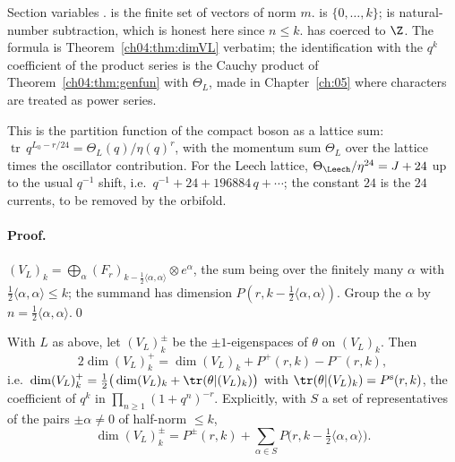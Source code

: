\begin{dictionary}
Section variables .  is the
finite set of vectors of norm $m$.  is $\{0,\dots,k\}$;  is
natural-number subtraction, which is honest here since $n\le k$.  has
 coerced to $\Z$. The formula is Theorem~\ref{ch04:thm:dimVL} verbatim; the identification
with the $q^k$ coefficient of the product series is the Cauchy product of
Theorem~\ref{ch04:thm:genfun} with $\Theta_L$, made in Chapter~\ref{ch:05} where characters are
treated as power series.
\end{dictionary}

\begin{physics}
This is the partition function of the compact boson as a lattice sum: $\operatorname{tr}\,q^{L_0-r/24}=\Theta_L(q)/\eta(q)^r$, with the momentum sum $\Theta_L$ over the lattice times the oscillator contribution. For the Leech lattice, $\Theta_\Leech/\eta^{24}=J+24$ up to the usual $q^{-1}$ shift, i.e.\ $q^{-1}+24+196884\,q+\cdots$; the constant $24$ is the $24$ currents, to be removed by the orbifold.
\end{physics}

\paragraph{Proof.} $(V_L)_k=\bigoplus_\alpha(F_r)_{k-\frac12\langle\alpha,\alpha\rangle}\otimes e^\alpha$, the
sum being over the finitely many $\alpha$ with $\tfrac12\langle\alpha,\alpha\rangle\le k$; the summand has
dimension $P(r,k-\tfrac12\langle\alpha,\alpha\rangle)$. Group the $\alpha$ by $n=\tfrac12\langle\alpha,\alpha\rangle$.\qed

\begin{theorem}\label{ch04:thm:dimVLplus}
With $L$ as above, let $(V_L)_k^\pm$ be the $\pm1$-eigenspaces of $\theta$ on $(V_L)_k$. Then
\begin{equation*}
  2\dim(V_L)_k^+=\dim(V_L)_k+P^+(r,k)-P^-(r,k),
\end{equation*}
i.e.\ $\dim(V_L)_k^+=\tfrac12\big(\dim(V_L)_k+\tr(\theta|(V_L)_k)\big)$ with
$\tr(\theta|(V_L)_k)=P^{\mathrm s}(r,k)$, the coefficient of $q^k$ in $\prod_{n\ge1}(1+q^n)^{-r}$.
Explicitly, with $S$ a set of representatives of the pairs $\pm\alpha\neq0$ of half-norm $\le k$,
\begin{equation*}
  \dim(V_L)_k^\pm=P^\pm(r,k)+\sum_{\alpha\in S}P\big(r,k-\tfrac12\langle\alpha,\alpha\rangle\big).
\end{equation*}
\end{theorem}

